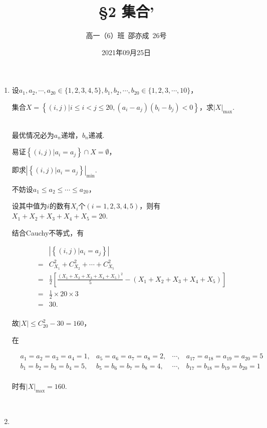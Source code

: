 \documentclass[8pt]{article}
\title{\S 2 集合'}
\author{高一（6）班\ 邵亦成\ 26号}
\date{2021年09月25日}
\begin{document}
	\maketitle

	\begin{enumerate}
		\item

			设$a_1,a_2,\cdots,a_{20}\in \{1,2,3,4,5\}, b_1,b_2,\cdots,b_{20}\in\{1,2,3,\cdots,10\}$，

			集合$X=\left\{(i,j)|i\leq i < j \leq 20, \left(a_i-a_j\right)\left(b_i-b_j\right)<0\right\}$，求$|X|_{\max}$.

			~\\
			最优情况必为$a_n$递增，$b_n$递减.

			易证$\left\{(i,j)|a_i=a_j\right\}\cap X = \emptyset$，

			即求$\left|\left\{(i,j)|a_i=a_j\right\}\right|_{\min}.$

			不妨设$a_1\leq a_2 \leq \cdots \leq a_{20}$，

			设其中值为$i$的数有$X_i$个$(i=1,2,3,4,5)$，则有$X_1+X_2+X_3+X_4+X_5=20$.

			结合Cauchy不等式，有

			$$
				\begin{array}{rl}
					&\left|\left\{(i,j)|a_i=a_j\right\}\right| \\
					=&C_{X_1}^2+C_{X_2}^2+\cdots+C_{X_5}^2\\
					=&\displaystyle{\frac{1}{2}\left[\frac{\left(X_1+X_2+X_3+X_4+X_5\right)^2}{5}-\left(X_1+X_2+X_3+X_4+X_5\right)\right]}\\
					=&\frac{1}{2}\times20\times3\\
					=&30.\\
				\end{array}
			$$

			故$|X|\leq C_{20}^2 - 30 = 160$，

			在

			$$
			\begin{aligned}
			&a_1=a_2=a_3=a_4=1, &a_5=a_6=a_7=a_8=2, &\cdots, &a_{17}=a_{18}=a_{19}=a_{20}=5\\
			&b_1=b_2=b_3=b_4=5, &b_5=b_6=b_7=b_8=4, &\cdots, &b_{17}=b_{18}=b_{19}=b_{20}=1\\
			\end{aligned}
			$$

			时有$|X|_{\max}=160$.

		~\\

		\item


\end{enumerate}
\end{document}
